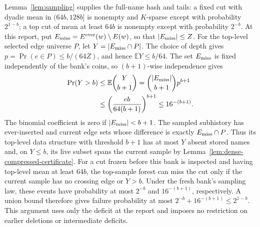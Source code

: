 \documentclass[11pt,letterpaper]{article}
\numberwithin{equation}{section}
\newcommand{\E}{\mathbb E}
\begin{document}
Lemma~\ref{lem:sampling} supplies the full-name hash and tails: a fixed cut with dyadic mean in $(64b,128b]$ is nonempty and $K$-sparse except with probability $2^{1-b}$; a top cut of mean at least $64b$ is nonempty except with probability $2^{-b}$.
At this report, put $E_{\rm miss}=E^{\rm ever}(w)\setminus E(w)$, so that $|E_{\rm miss}|\le Z$.
For the top-level selected edge universe $P$, let $Y=|E_{\rm miss}\cap P|$.
The choice of depth gives $p=\Pr(e\in P)\le b/(64Z)$, and hence $\E Y\le b/64$.
The set $E_{\rm miss}$ is fixed independently of the bank's coins, so $(b+1)$-wise independence gives
\begin{equation}
\begin{aligned}
\Pr(Y>b)&\le\E\binom{Y}{b+1}
 =\binom{|E_{\rm miss}|}{b+1}p^{b+1}\\
 &\le\left(\frac{eb}{64(b+1)}\right)^{b+1}
 \le16^{-(b+1)}.
\end{aligned}                                       \label{eq:forest-df9}
\end{equation}
The binomial coefficient is zero if $|E_{\rm miss}|<b+1$.
The sampled subhistory has ever-inserted and current edge sets whose difference is exactly $E_{\rm miss}\cap P$.
Thus its top-level data structure with threshold $b+1$ has at most $Y$ absent stored names and, on $Y\le b$, its live subset spans the current sample by Lemma~\ref{lem:dense-compressed-certificate}.
For a cut frozen before this bank is inspected and having top-level mean at least $64b$, the top-sample forest can miss the cut only if the current sample has no crossing edge or $Y>b$.
Under the fresh bank's sampling law, these events have probability at most $2^{-b}$ and $16^{-(b+1)}$, respectively.
A union bound therefore gives failure probability at most $2^{-b}+16^{-(b+1)}\le2^{1-b}$.
This argument uses only the deficit at the report and imposes no restriction on earlier deletions or intermediate deficits.
\end{document}
